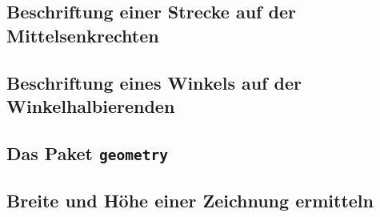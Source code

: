 \documentclass
[
  draft      = true,
  fontsize   = 11pt,
  parskip    = half-,
  BCOR       = 0pt,
  DIV        = 10,
  dvipsnames %
]
{scrartcl}
\begin{document}
\subsection{Beschriftung einer Strecke auf der Mittelsenkrechten}
\begin{footnotesize}

\end{footnotesize}

\subsection{Beschriftung eines Winkels auf der Winkelhalbierenden}
\begin{footnotesize}

\end{footnotesize}

\subsection{Das Paket \texttt{geometry}}
\begin{footnotesize}

\end{footnotesize}

\subsection{Breite und Höhe einer Zeichnung ermitteln}
\begin{footnotesize}

\end{footnotesize}

\end{document}
